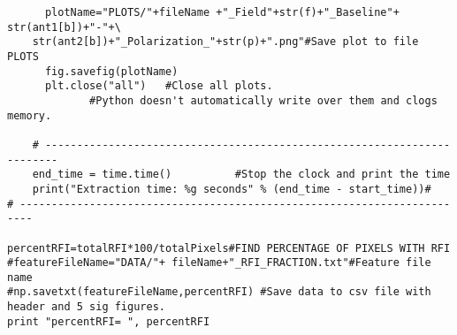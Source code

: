 \begin{verbatim}
      plotName="PLOTS/"+fileName +"_Field"+str(f)+"_Baseline"+ str(ant1[b])+"-"+\
	str(ant2[b])+"_Polarization_"+str(p)+".png"#Save plot to file PLOTS
      fig.savefig(plotName)      
      plt.close("all")	 #Close all plots. 
			 #Python doesn't automatically write over them and clogs memory.
    
    # ------------------------------------------------------------------------
    end_time = time.time()			#Stop the clock and print the time
    print("Extraction time: %g seconds" % (end_time - start_time))#
# ------------------------------------------------------------------------

percentRFI=totalRFI*100/totalPixels#FIND PERCENTAGE OF PIXELS WITH RFI
#featureFileName="DATA/"+ fileName+"_RFI_FRACTION.txt"#Feature file name
#np.savetxt(featureFileName,percentRFI) #Save data to csv file with header and 5 sig figures.
print "percentRFI= ", percentRFI
\end{verbatim}
